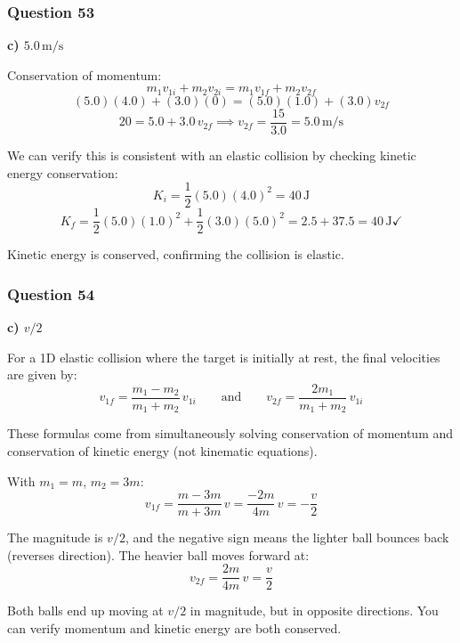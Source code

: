 \documentclass[12pt,letterpaper]{article}
\begin{document}
\subsubsection*{Question 53}

\begin{answerbox}
\textbf{c) $5.0\,\text{m/s}$}
\end{answerbox}

\begin{explanationbox}
Conservation of momentum:
\[
m_1 v_{1i} + m_2 v_{2i} = m_1 v_{1f} + m_2 v_{2f}
\]
\[
(5.0)(4.0) + (3.0)(0) = (5.0)(1.0) + (3.0)v_{2f}
\]
\[
20 = 5.0 + 3.0\,v_{2f} \implies v_{2f} = \frac{15}{3.0} = 5.0\,\text{m/s}
\]

We can verify this is consistent with an elastic collision by checking kinetic energy conservation:
\[
K_i = \frac{1}{2}(5.0)(4.0)^2 = 40\,\text{J}
\]
\[
K_f = \frac{1}{2}(5.0)(1.0)^2 + \frac{1}{2}(3.0)(5.0)^2 = 2.5 + 37.5 = 40\,\text{J} \checkmark
\]

Kinetic energy is conserved, confirming the collision is elastic.
\end{explanationbox}

\subsubsection*{Question 54}

\begin{answerbox}
\textbf{c) $v/2$}
\end{answerbox}

\begin{explanationbox}
For a 1D elastic collision where the target is initially at rest, the final velocities are given by:
\[
v_{1f} = \frac{m_1 - m_2}{m_1 + m_2}\,v_{1i} \qquad \text{and} \qquad v_{2f} = \frac{2m_1}{m_1 + m_2}\,v_{1i}
\]

These formulas come from simultaneously solving conservation of momentum and conservation of kinetic energy (not kinematic equations).

With $m_1 = m$, $m_2 = 3m$:
\[
v_{1f} = \frac{m - 3m}{m + 3m}\,v = \frac{-2m}{4m}\,v = -\frac{v}{2}
\]

The magnitude is $v/2$, and the negative sign means the lighter ball bounces back (reverses direction). The heavier ball moves forward at:
\[
v_{2f} = \frac{2m}{4m}\,v = \frac{v}{2}
\]

Both balls end up moving at $v/2$ in magnitude, but in opposite directions. You can verify momentum and kinetic energy are both conserved.
\end{explanationbox}
\end{document}
